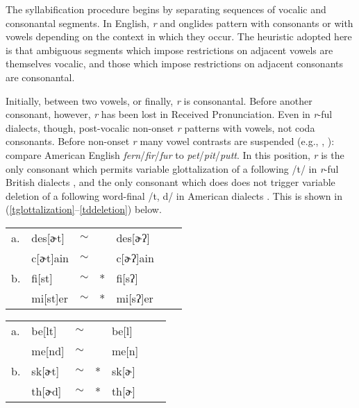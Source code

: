 \documentclass[12pt]{article}
\newcommand{\alt}{\ensuremath{\sim}}
\begin{document}
The syllabification procedure begins by separating sequences of vocalic and consonantal segments. In English, \emph{r} and onglides pattern with consonants or with vowels depending on the context in which they occur. The heuristic adopted here is that ambiguous segments which impose restrictions on adjacent vowels are themselves vocalic, and those which impose restrictions on adjacent consonants are consonantal.

Initially, between two vowels, or finally, \emph{r} is consonantal. Before another consonant, however, \emph{r} has been lost in Received Pronunciation. Even in \emph{r}-ful dialects, though, post-vocalic non-onset \emph{r} patterns with vowels, not coda consonants. Before non-onset \emph{r} many vowel contrasts are suspended (e.g., \citealp[269f.]{Fudge1969}, \citealp[][255]{Harris1994}): compare American English \emph{fern}/\emph{fir}/\emph{fur} to \emph{pet}/\emph{pit}/\emph{putt}. In this position, \emph{r} is the only consonant which permits variable glottalization of a following /t/ in \emph{r}-ful British dialects \citep[258]{Harris1994}, and the only consonant which does does not trigger variable deletion of a following word-final /t, d/ in American dialects \citep[8]{Guy1980}. This is shown in (\ref{tglottalization}--\ref{tddeletion}) below.

\begin{example}
\label{tglottalization}
\begin{tabular}{l l l l@{} l l l}
a. & {des}[ɚt]    & \alt{} &   & {des}[ɚʔ]    \\
   & {c}[ɚt]{ain} & \alt{} &   & {c}[ɚʔ]{ain} \\
b. & {fi}[st]     & \alt{} & * & {fi}[sʔ]     \\
   & {mi}[st]{er} & \alt{} & * & {mi}[sʔ]{er} \\
\end{tabular}
\end{example}

\begin{example}
\label{tddeletion}
\begin{tabular}{l l l l@{} l l l}
a. & {be}[lt] & \alt{} &   & {be}[l] \\
   & {me}[nd] & \alt{} &   & {me}[n] \\
b. & {sk}[ɚt] & \alt{} & * & {sk}[ɚ] \\
   & {th}[ɚd] & \alt{} & * & {th}[ɚ] \\
\end{tabular}
\end{example}
\end{document}
